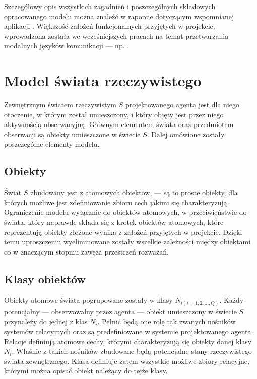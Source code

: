 Szczegółowy opis wszystkich zagadnień i poszczególnych składowych opracowanego modelu można znaleźć w raporcie dotyczącym wspomnianej aplikacji \cite{raport}. Większość założeń funkcjonalnych przyjętych w projekcie, wprowadzona została we wcześniejszych pracach na temat przetwarzania modalnych języków komunikacji --- np. \cite{kat99} \cite{kat07}.


\section{Model świata rzeczywistego}

Zewnętrznym światem rzeczywistym $ S $ projektowanego agenta jest dla niego otoczenie, w którym został umieszczony, i który objęty jest przez niego aktywnością obserwacyjną. Głównym elementem świata oraz przedmiotem obserwacji są obiekty umieszczone w świecie $ S $. Dalej omówione zostały poszczególne elementy modelu.


	\subsection{Obiekty}
	
	Świat $ S $ zbudowany jest z atomowych obiektów, --- są to proste obiekty, dla których możliwe jest zdefiniowanie zbioru cech jakimi się charakteryzują. Ograniczenie modelu wyłącznie do obiektów atomowych, w przeciwieństwie do świata, który naprawdę składa się z krotek obiektów atomowych, które reprezentują obiekty złożone wynika z założeń przyjętych w projekcie. Dzięki temu uproszczeniu wyeliminowane zostały wszelkie zależności między obiektami co w znaczącym stopniu zawęża przestrzeń rozważań.
	
	
	\subsection{Klasy obiektów}
	
	Obiekty atomowe świata pogrupowane zostały w klasy $ N_{i(i=1,2,...,Q)} $. Każdy potencjalny --- obserwowalny przez agenta --- obiekt umieszczony w świecie $ S $ przynależy do jednej z klas $ N_i $. Pełnić będą one rolę tak zwanych nośników systemów relacyjnych oraz są predefiniowane w systemie projektowanego agenta. Relacje definiują atomowe cechy, którymi charakteryzują się obiekty danej klasy $ N_i $. Właśnie z takich nośników zbudowane będą potencjalne stany rzeczywistego świata zewnętrznego. Klasa definiuje zatem wszystkie możliwe zbiory relacyjne, którymi można opisać obiekt należący do tejże klasy.
	
